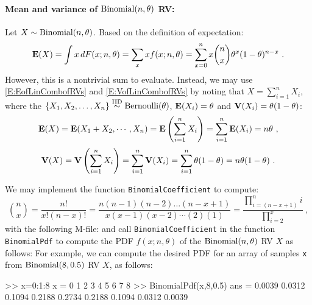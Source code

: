 \paragraph{Mean and variance of $\mbox{{\rm Binomial}}(n,\theta)$ RV:}
Let $X \sim \mbox{{\rm Binomial}}(n,\theta)$.  Based on the definition of expectation:
\[
\e(X) = \int x \, dF(x; n,\theta) = \sum_x x f(x;n,\theta) = \sum_{x =0}^n x \binom{n}{x} \theta^x (1-\theta)^{n-x} \ .
\]
However, this is a nontrivial sum to evaluate.  Instead, we may use \eqref{E:EofLinCombofRVs} and \eqref{E:VofLinCombofRVs} by noting that $X = \sum_{i=1}^n X_i$, where the $\{X_1,X_2,\ldots,X_n \} \overset{{\rm IID}}{\sim} \mbox{{\rm Bernoulli}}(\theta)$, $\mathbf{E}(X_i) = \theta$ and $\mathbf{V}(X_i)=\theta(1-\theta)$:
\[
\mathbf{E}(X) = \mathbf{E}(X_1+X_2, \cdots ,X_n) = \mathbf{E} \left( \sum_{i=1}^n X_i \right) = \sum_{i=1}^n \mathbf{E}(X_i) = n \theta \ ,
\]
\[
\mathbf{V}(X) = \mathbf{V} \left( \sum_{i=1}^n X_i \right) = \sum_{i=1}^n \mathbf{V}(X_i) = \sum_{i=1}^n{\theta(1-\theta)} = n\theta(1-\theta) \ .
\]

\begin{labwork}\label{LW:BinomialPdf}
We may implement the \Matlab function {\tt BinomialCoefficient} to compute:
\[
\binom{n}{x} =  \frac{n !}{x! (n-x)!} = \frac{n(n-1)(n-2)\ldots(n-x+1)}{x(x-1)(x-2)\cdots (2)(1)} = \frac{\prod_{i=(n-x+1)}^n i}{\prod_{i=2}^x} \ ,
\]
with the following M-file:
and call {\tt BinomialCoefficient} in the function {\tt BinomialPdf} to compute the PDF $f(x;n,\theta)$ of the $\mbox{{\rm Binomial}}(n,\theta)$ RV $X$ as follows:
For example, we can compute the desired PDF for an array of samples {\tt x} from $\mbox{{\rm Binomial}}(8,0.5)$ RV $X$, as follows:
\begin{VrbM}
>> x=0:1:8
x =     0     1     2     3     4     5     6     7     8
>> BinomialPdf(x,8,0.5)
ans =    0.0039    0.0312    0.1094    0.2188    0.2734    0.2188    0.1094    0.0312    0.0039
\end{VrbM}
\end{labwork}


